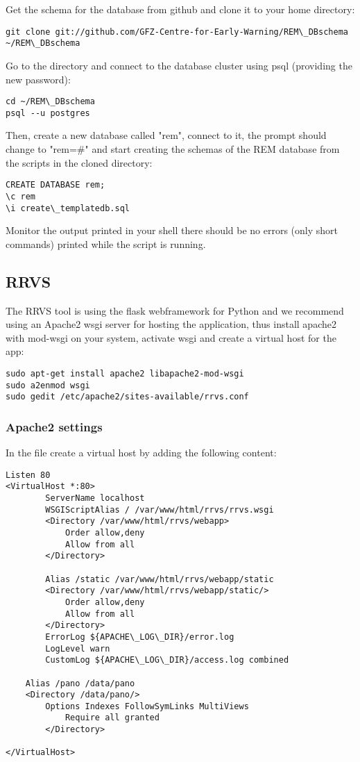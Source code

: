 \documentclass{article}
\begin{document}
Get the schema for the database from github and clone it to your home directory:
\begin{verbatim}
git clone git://github.com/GFZ-Centre-for-Early-Warning/REM\_DBschema ~/REM\_DBschema
\end{verbatim}

Go to the directory and connect to the database cluster using psql (providing the new password):
\begin{verbatim}
cd ~/REM\_DBschema
psql --u postgres
\end{verbatim}

Then, create a new database called "rem", connect to it, the prompt
should change to "rem=\#" and
start creating the schemas of the REM database from the scripts 
in the cloned directory:
\begin{verbatim}
CREATE DATABASE rem;
\c rem
\i create\_templatedb.sql
\end{verbatim}
Monitor the output printed in your shell there should be no errors
(only short commands) printed while the script is running.

\subsection{RRVS}
The RRVS tool is using the flask webframework for Python and we 
recommend using an Apache2 wsgi server for hosting the application,
thus install apache2 with mod-wsgi on your system, activate wsgi
and create a virtual host for the app:
\begin{verbatim}
sudo apt-get install apache2 libapache2-mod-wsgi
sudo a2enmod wsgi
sudo gedit /etc/apache2/sites-available/rrvs.conf
\end{verbatim}

\subsubsection{Apache2 settings}
In the file create a virtual host by adding the following content:
\begin{verbatim}
Listen 80  
<VirtualHost *:80>  
        ServerName localhost  
        WSGIScriptAlias / /var/www/html/rrvs/rrvs.wsgi  
        <Directory /var/www/html/rrvs/webapp>  
            Order allow,deny  
            Allow from all  
        </Directory>
  
        Alias /static /var/www/html/rrvs/webapp/static  
        <Directory /var/www/html/rrvs/webapp/static/>  
            Order allow,deny  
            Allow from all  
        </Directory>  
        ErrorLog ${APACHE\_LOG\_DIR}/error.log  
        LogLevel warn  
        CustomLog ${APACHE\_LOG\_DIR}/access.log combined  
	
	Alias /pano /data/pano                           
	<Directory /data/pano/>       
 	    Options Indexes FollowSymLinks MultiViews
     	    Require all granted
        </Directory>

</VirtualHost>
\end{verbatim}
\end{document}

